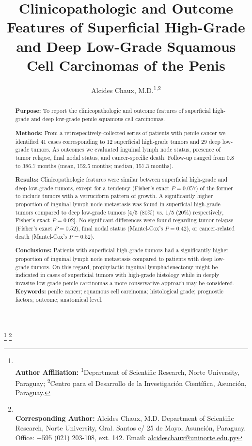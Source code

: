 \documentclass[11pt,letterpaper]{article}\usepackage[]{graphicx}\usepackage[]{color}
\title{\textbf{Clinicopathologic and Outcome Features of Superficial High-Grade and Deep Low-Grade Squamous Cell Carcinomas of the Penis}}
\author{Alcides Chaux, M.D.\textsuperscript{1,2}}
\date{}
\begin{document}
\maketitle

\begin{abstract}

\textbf{Purpose:} To report the clinicopathologic and outcome features of superficial high-grade and deep low-grade penile squamous cell carcinomas.

\textbf{Methods:} From a retrospectively-collected series of patients with penile cancer we identified 41 cases corresponding to 12 superficial high-grade tumors and 29 deep low-grade tumors. As outcomes we evaluated inguinal lymph node status, presence of tumor relapse, final nodal status, and cancer-specific death. Follow-up ranged from 0.8 to 386.7 months (mean, 152.5 months; median, 157.3 months).

\textbf{Results:} Clinicopathologic features were similar between superficial high-grade and deep low-grade tumors, except for a tendency (Fisher's exact $P=0.057$) of the former to include tumors with a verruciform pattern of growth. A significantly higher proportion of inguinal lymph node metastasis was found in superficial high-grade tumors compared to deep low-grade tumors [4/5 (80\%) vs. 1/5 (20\%) respectively, Fisher's exact $P=0.02$]. No significant differences were found regarding tumor relapse (Fisher's exact $P=0.52$), final nodal status (Mantel-Cox's $P=0.42$), or cancer-related death (Mantel-Cox's $P=0.52$).

\textbf{Conclusions:} Patients with superficial high-grade tumors had a significantly higher proportion of inguinal lymph node metastasis compared to patients with deep low-grade tumors. On this regard, prophylactic inguinal lymphadenectomy might be indicated in cases of superficial tumors with high-grade histology while in deeply invasive low-grade penile carcinomas a more conservative approach may be considered.\\

\textbf{Keywords:} penile cancer; squamous cell carcinoma; histological grade; prognostic factors; outcome; anatomical level.
\end{abstract}

\let\thefootnote\relax\footnote{
\\ \textbf{Author Affiliation:} \textsuperscript{1}Department of Scientific Research, Norte University, Paraguay; \textsuperscript{2}Centro para el Desarrollo de la Investigación Científica, Asunción, Paraguay.
}
\let\thefootnote\relax\footnote{
\\ \textbf{Corresponding Author:} Alcides Chaux, M.D. Department of Scientific Research, Norte University, Gral. Santos e/ 25 de Mayo, Asunción, Paraguay. Office: +595 (021) 203-108, ext. 142. Email: \href{mailto:alcideschaux@uninorte.edu.py}{alcideschaux@uninorte.edu.py}
}
\end{document}
